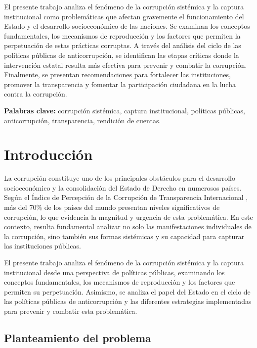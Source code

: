 \documentclass[12pt,a4paper]{article}
\begin{document}
El presente trabajo analiza el fenómeno de la corrupción sistémica y la captura institucional como problemáticas que afectan gravemente el funcionamiento del Estado y el desarrollo socioeconómico de las naciones. Se examinan los conceptos fundamentales, los mecanismos de reproducción y los factores que permiten la perpetuación de estas prácticas corruptas. A través del análisis del ciclo de las políticas públicas de anticorrupción, se identifican las etapas críticas donde la intervención estatal resulta más efectiva para prevenir y combatir la corrupción. Finalmente, se presentan recomendaciones para fortalecer las instituciones, promover la transparencia y fomentar la participación ciudadana en la lucha contra la corrupción.

\textbf{Palabras clave:} corrupción sistémica, captura institucional, políticas públicas, anticorrupción, transparencia, rendición de cuentas.

\section{Introducción}

La corrupción constituye uno de los principales obstáculos para el desarrollo socioeconómico y la consolidación del Estado de Derecho en numerosos países. Según el Índice de Percepción de la Corrupción de Transparencia Internacional \parencite{transparencia2023}, más del 70\% de los países del mundo presentan niveles significativos de corrupción, lo que evidencia la magnitud y urgencia de esta problemática. En este contexto, resulta fundamental analizar no solo las manifestaciones individuales de la corrupción, sino también sus formas sistémicas y su capacidad para capturar las instituciones públicas.

El presente trabajo analiza el fenómeno de la corrupción sistémica y la captura institucional desde una perspectiva de políticas públicas, examinando los conceptos fundamentales, los mecanismos de reproducción y los factores que permiten su perpetuación. Asimismo, se analiza el papel del Estado en el ciclo de las políticas públicas de anticorrupción y las diferentes estrategias implementadas para prevenir y combatir esta problemática.

\subsection{Planteamiento del problema}
\end{document}
